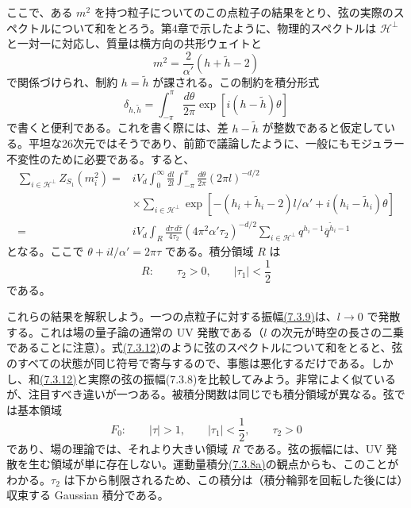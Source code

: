 ここで、ある $m^2$ を持つ粒子についてのこの点粒子の結果をとり、弦の実際のスペクトルについて和をとろう。第4章で示したように、物理的スペクトルは $\mathcal H^\perp$ と一対一に対応し、質量は横方向の共形ウェイトと
\begin{equation}
m^2=\frac2{\alpha'}(h+\tilde h-2)
\tag{7.3.10}\label{eq:7.3.10}
\end{equation}
で関係づけられ、制約 $h=\tilde h$ が課される。この制約を積分形式
\begin{equation}
\delta_{h,\tilde h}
=\int_{-\pi}^{\pi}\frac{d\theta}{2\pi}
\exp[i(h-\tilde h)\theta]
\tag{7.3.11}\label{eq:7.3.11}
\end{equation}
で書くと便利である。これを書く際には、差 $h-\tilde h$ が整数であると仮定している。平坦な26次元ではそうであり、前節で議論したように、一般にもモジュラー不変性のために必要である。すると、
\begin{equation}
\begin{aligned}
\sum_{i\in\mathcal H^\perp}Z_{S_1}(m_i^2)
={}&iV_d\int_0^\infty\frac{dl}{2l}
\int_{-\pi}^{\pi}\frac{d\theta}{2\pi}(2\pi l)^{-d/2}\\
&\times\sum_{i\in\mathcal H^\perp}
\exp[-(h_i+\tilde h_i-2)l/\alpha'+i(h_i-\tilde h_i)\theta]\\
={}&iV_d\int_R\frac{d\tau\,d\bar\tau}{4\tau_2}
(4\pi^2\alpha'\tau_2)^{-d/2}
\sum_{i\in\mathcal H^\perp}q^{h_i-1}\bar q^{\tilde h_i-1}
\end{aligned}
\tag{7.3.12}\label{eq:7.3.12}
\end{equation}
となる。ここで $\theta+il/\alpha'=2\pi\tau$ である。積分領域 $R$ は
\begin{equation}
R:\qquad\tau_2>0,\qquad|\tau_1|<\frac12
\tag{7.3.13}\label{eq:7.3.13}
\end{equation}
である。

これらの結果を解釈しよう。一つの点粒子に対する振幅\hyperref[eq:7.3.9]{(7.3.9)}は、$l\to0$ で発散する。これは場の量子論の通常の UV 発散である（$l$ の次元が時空の長さの二乗であることに注意）。式\hyperref[eq:7.3.12]{(7.3.12)}のように弦のスペクトルについて和をとると、弦のすべての状態が同じ符号で寄与するので、事態は悪化するだけである。しかし、和\hyperref[eq:7.3.12]{(7.3.12)}と実際の弦の振幅(7.3.8)を比較してみよう。非常によく似ているが、注目すべき違いが一つある。被積分関数は同じでも積分領域が異なる。弦では基本領域
\begin{equation}
F_0:\qquad|\tau|>1,\qquad|\tau_1|<\frac12,\qquad\tau_2>0
\tag{7.3.14}\label{eq:7.3.14}
\end{equation}
であり、場の理論では、それより大きい領域 $R$ である。弦の振幅には、UV 発散を生む領域が単に存在しない。運動量積分\hyperref[eq:7.3.8a]{(7.3.8a)}の観点からも、このことがわかる。$\tau_2$ は下から制限されるため、この積分は（積分輪郭を回転した後には）収束する Gaussian 積分である。

